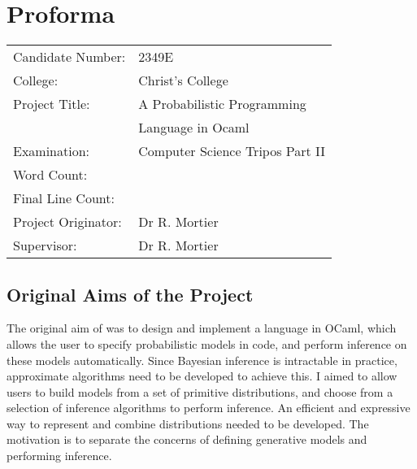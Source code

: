 \immediate{}
\immediate{}
\chapter*{Proforma}

{\large
	\begin{tabular}{ll}
		Candidate Number:   & 2349E                                 \\
		College:            & Christ's College                      \\
		Project Title:      & A Probabilistic Programming           \\
		                    & Language in Ocaml                     \\
		Examination:        & Computer Science Tripos Part II       \\
		Word Count:         & \footnotemark[1] \\
		Final Line Count:   & \footnotemark[2] \\
		Project Originator: & Dr R. Mortier                         \\
		Supervisor:         & Dr R. Mortier                         \\ 
	\end{tabular} 
}


\section*{Original Aims of the Project}

The original aim of was to design and implement a language in OCaml, which allows the user to specify probabilistic models in code, and perform inference on these models automatically. Since Bayesian inference is intractable in practice, approximate algorithms need to be developed to achieve this. I aimed to allow users to build models from a set of primitive distributions, and choose from a selection of inference algorithms to perform inference. An efficient and expressive way to represent and combine distributions needed to be developed. The motivation is to separate the concerns of defining generative models and performing inference.

